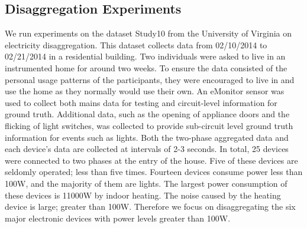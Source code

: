 \subsection{Disaggregation Experiments}
We run experiments on the dataset Study10 from the University of Virginia on electricity disaggregation. 
This dataset collects data from 02/10/2014 to 02/21/2014 in a residential building. 
Two individuals were asked to live in an instrumented home for around two weeks. 
To ensure the data consisted of the personal usage patterns of the participants, 
they were encouraged to live in and use the home as they normally would use their own. 
An eMonitor \cite{eMonitor} sensor was used to collect both mains data for testing and circuit-level information for ground truth. 
Additional data, such as the opening of appliance doors and the flicking of light switches, 
was collected to provide sub-circuit level ground truth information for events such as lights.
Both the two-phase aggregated data and each device's data are collected at intervals of 2-3 seconds.
In total, 25 devices were connected to two phases at the entry of the house. 
Five of these devices are seldomly operated; less than five times. 
Fourteen devices consume power less than 100W, and the majority of them are lights. 
The largest power consumption of these devices is 11000W by indoor heating. 
The noise caused by the heating device is large; greater than 100W. 
Therefore we focus on disaggregating the six major electronic devices 
with power levels greater than 100W. 
 
%

